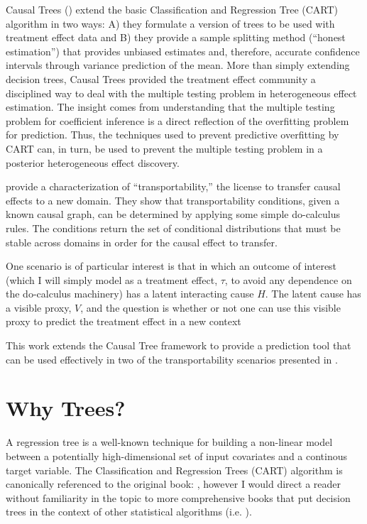 \documentclass[a4paper,12pt]{article}
\theoremstyle{proposition}
\begin{document}
Causal Trees (\cite{Athey2016}) extend the basic Classification and Regression Tree (CART) algorithm in two ways: A) they formulate a version of trees to be used with treatment effect data and B) they provide a sample splitting method (``honest estimation'') that provides unbiased estimates and, therefore, accurate confidence intervals through variance prediction of the mean. More than simply extending decision trees, Causal Trees provided the treatment effect community a disciplined way to deal with the multiple testing problem in heterogeneous effect estimation. The insight comes from understanding that the multiple testing problem for coefficient inference is a direct reflection of the overfitting problem for prediction. Thus, the techniques used to prevent predictive overfitting by CART can, in turn, be used to prevent the multiple testing problem in a posterior heterogeneous effect discovery.


\cite{Pearl2014} provide a characterization of ``transportability,'' the license to transfer causal effects to a new domain. They show that transportability conditions, given a known causal graph, can be determined by applying some simple do-calculus rules. The conditions return the set of conditional distributions that must be stable across domains in order for the causal effect to transfer.

One scenario is of particular interest is that in which an outcome of interest (which I will simply model as a treatment effect, $\tau$, to avoid any dependence on the do-calculus machinery) has a latent interacting cause $H$. The latent cause has a visible proxy, $V$, and the question is whether or not one can use this visible proxy to predict the treatment effect in a new context

This work extends the Causal Tree framework to provide a prediction tool that can be used effectively in two of the transportability scenarios presented in \cite{Pearl2014}.

\section{Why Trees?}

A regression tree is a well-known technique for building a non-linear model between a potentially high-dimensional set of input covariates and a continous target variable. The Classification and Regression Trees (CART) algorithm is canonically referenced to the original book: \cite{breiman1984classification}, however I would direct a reader without familiarity in the topic to more comprehensive books that put decision trees in the context of other statistical algorithms (i.e. \cite{bishop2006pattern}).
\end{document}
